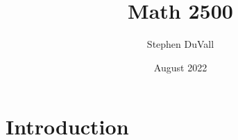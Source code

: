 \documentclass{article}
\title{Math 2500}
\author{Stephen DuVall}
\date{August 2022}
\begin{document}
\maketitle

\section{Introduction}
\end{document}
